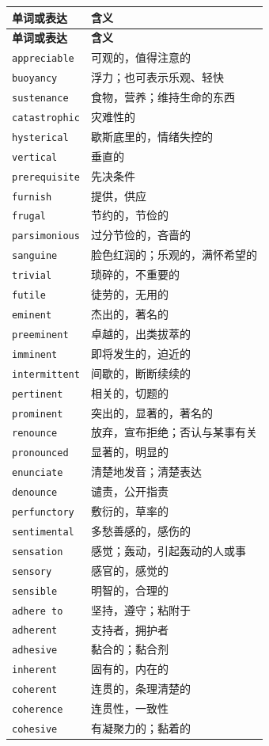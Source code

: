 \documentclass[UTF8,zihao=-4]{ctexart}
\begin{document}
\begin{longtable}{>{\raggedright\arraybackslash}p{4.5cm} >{\raggedright\arraybackslash}p{10cm}}
\toprule
\textbf{单词或表达} & \textbf{含义} \\
\midrule
\endfirsthead
\toprule
\textbf{单词或表达} & \textbf{含义} \\
\midrule
\endhead
\texttt{appreciable} & 可观的，值得注意的 \\
\texttt{buoyancy} & 浮力；也可表示乐观、轻快 \\
\texttt{sustenance} & 食物，营养；维持生命的东西 \\
\texttt{catastrophic} & 灾难性的 \\
\texttt{hysterical} & 歇斯底里的，情绪失控的 \\
\texttt{vertical} & 垂直的 \\
\texttt{prerequisite} & 先决条件 \\
\texttt{furnish} & 提供，供应 \\
\texttt{frugal} & 节约的，节俭的 \\
\texttt{parsimonious} & 过分节俭的，吝啬的 \\
\texttt{sanguine} & 脸色红润的；乐观的，满怀希望的 \\
\texttt{trivial} & 琐碎的，不重要的 \\
\texttt{futile} & 徒劳的，无用的 \\
\texttt{eminent} & 杰出的，著名的 \\
\texttt{preeminent} & 卓越的，出类拔萃的 \\
\texttt{imminent} & 即将发生的，迫近的 \\
\texttt{intermittent} & 间歇的，断断续续的 \\
\texttt{pertinent} & 相关的，切题的 \\
\texttt{prominent} & 突出的，显著的，著名的 \\
\texttt{renounce} & 放弃，宣布拒绝；否认与某事有关 \\
\texttt{pronounced} & 显著的，明显的 \\
\texttt{enunciate} & 清楚地发音；清楚表达 \\
\texttt{denounce} & 谴责，公开指责 \\
\texttt{perfunctory} & 敷衍的，草率的 \\
\texttt{sentimental} & 多愁善感的，感伤的 \\
\texttt{sensation} & 感觉；轰动，引起轰动的人或事 \\
\texttt{sensory} & 感官的，感觉的 \\
\texttt{sensible} & 明智的，合理的 \\
\texttt{adhere to} & 坚持，遵守；粘附于 \\
\texttt{adherent} & 支持者，拥护者 \\
\texttt{adhesive} & 黏合的；黏合剂 \\
\texttt{inherent} & 固有的，内在的 \\
\texttt{coherent} & 连贯的，条理清楚的 \\
\texttt{coherence} & 连贯性，一致性 \\
\texttt{cohesive} & 有凝聚力的；黏着的 \\
\bottomrule
\end{longtable}
\end{document}
